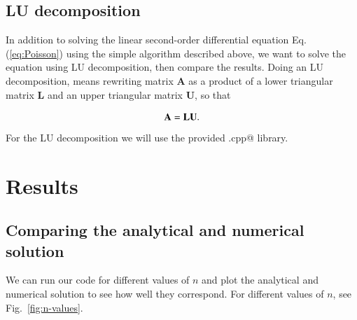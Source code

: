 \documentclass{article}
\begin{document}
\begin{multicols}{2}
\subsection{LU decomposition}
In addition to solving the linear second-order differential equation Eq. (\ref{eq:Poisson}) using the simple algorithm described above, we want to solve the equation using LU decomposition, then compare the results. Doing an LU decomposition, means rewriting matrix {\bf A} as a product of a lower triangular matrix {\bf L} and an upper triangular matrix {\bf U}, so that

\begin{equation*}
	{\bf A} = {\bf L}{\bf U}.
\end{equation*}
For the LU decomposition we will use the provided \verb@lib.cpp@ library.




\section{Results}    \label{sec:analysis}

\subsection{Comparing the analytical and numerical solution}
We can run our code for different values of $n$ and plot the analytical and numerical solution to see how well they correspond. For different values of $n$, see Fig.~\ref{fig:n-values}.


\end{multicols}
\end{document}
